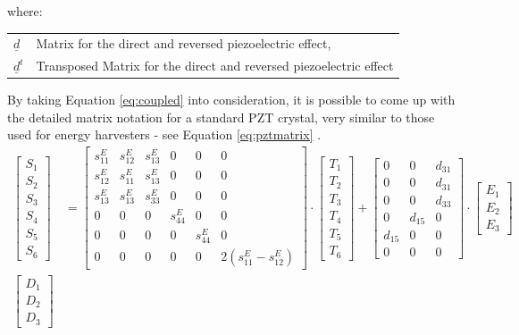 \documentclass[12pt,a4paper]{article}
\makeatletter
\newenvironment{conditions}
  {\par\vspace{\abovedisplayskip}\noindent\begin{tabular}{>{$}l<{$} @{${}-{}$} l}}
  {\end{tabular}\par\vspace{\belowdisplayskip}}
\makeatother
\begin{document}
where:
\begin{conditions}
	\underline{d}     &  Matrix for the direct and reversed piezoelectric effect,  \\
		\underline{d}^t     &  Transposed Matrix for the direct and reversed piezoelectric effect 
\end{conditions}
By taking Equation \ref{eq:coupled} into consideration, it is possible to come up with the detailed matrix notation for a standard PZT crystal, very similar to those used for energy harvesters - see Equation \ref{eq:pztmatrix} \cite{cmos}.
\begin{equation}
\begin{aligned}
\begin{bmatrix}
S_{1}\\ 
S_{2}\\ 
S_{3}\\ 
S_{4}\\ 
S_{5}\\
S_{6} 
\end{bmatrix}
&=
\begin{bmatrix}
s_{11}^{E} & s_{12}^{E} & s_{13}^{E} & 0 & 0 & 0\\ 
s_{12}^{E} & s_{11}^{E} & s_{13}^{E} & 0 & 0 & 0\\ 
s_{13}^{E} & s_{13}^{E} & s_{33}^{E} & 0 & 0 & 0\\ 
0 & 0 & 0 & s_{44}^{E} & 0 & 0\\ 
0 & 0 & 0 & 0 & s_{44}^{E} & 0\\ 
0 & 0 & 0 & 0 & 0 & 2(s_{11}^{E}-s_{12}^{E})
\end{bmatrix}
\cdot
\begin{bmatrix}
T_{1}\\ 
T_{2}\\ 
T_{3}\\ 
T_{4}\\ 
T_{5}\\
T_{6} 
\end{bmatrix}
+
\begin{bmatrix}
0 & 0 & d_{31}\\ 
0 & 0 & d_{31}\\ 
0 & 0 & d_{33}\\ 
0 & d_{15} & 0\\ 
d_{15} & 0 & 0\\ 
0 & 0 & 0
\end{bmatrix}
\cdot
\begin{bmatrix}
E_1\\ 
E_2\\ 
E_3
\end{bmatrix}
\\
\begin{bmatrix}
D_{1}\\ 
D_{2}\\ 
D_{3} 
 

\end{bmatrix}
\end{aligned}
\end{equation}
\end{document}
